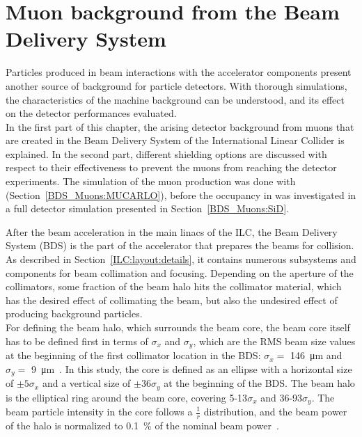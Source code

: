 \chapter{Muon background from the Beam Delivery System}
\label{BDS_Muons}

\begin{chapterabstract}
 Particles produced in beam interactions with the accelerator components present another source of background for particle detectors.
 With thorough simulations, the characteristics of the machine background can be understood, and its effect on the detector performances evaluated.
 \\In the first part of this chapter, the arising detector background from muons that are created in the Beam Delivery System of the International Linear Collider is explained.
 In the second part, different shielding options are discussed with respect to their effectiveness to prevent the muons from reaching the detector experiments.
 The simulation of the muon production was done with \mucarlo (Section~\ref{BDS_Muons:MUCARLO}), before the occupancy in \sid was investigated in a full detector simulation presented in Section~\ref{BDS_Muons:SiD}.
\end{chapterabstract}
\vspace*{0.5cm}\newline
\noindent
After the beam acceleration in the main linacs of the ILC, the Beam Delivery System (BDS) is the part of the accelerator that prepares the beams for collision.
As described in Section~\ref{ILC:layout:details}, it contains numerous subsystems and components for beam collimation and focusing. 
Depending on the aperture of the collimators, some fraction of the beam halo hits the collimator material, which has the desired effect of collimating the beam, but also the undesired effect of producing background particles.
\\For defining the beam halo, which surrounds the beam core, the beam core itself has to be defined first in terms of $\sigma_x$ and $\sigma_y$, which are the RMS beam size values at the beginning of the first collimator location in the BDS: $\sigma_x = $ \SI{146}{\micro\meter} and $\sigma_y = $ \SI{9}{\micro\meter}~\cite{Lewis}.
In this study, the core is defined as an ellipse with a horizontal size of $\pm 5\sigma_x$ and a vertical size of $\pm 36\sigma_y$ at the beginning of the BDS.
The beam halo is the elliptical ring around the beam core, covering 5-13$\sigma_x$ and 36-93$\sigma_y$.
The beam particle intensity in the core follows a $\frac{1}{r}$ distribution, and the beam power of the halo is normalized to \SI{0.1}{\percent} of the nominal beam power~\cite{Glens_muon_talk}.
